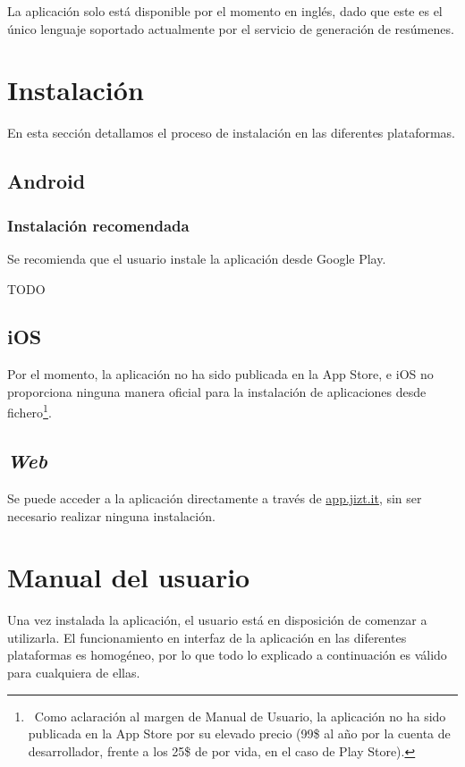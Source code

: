La aplicación solo está disponible por el momento en inglés, dado que este es el único lenguaje soportado actualmente por el servicio de generación de resúmenes.

\section{Instalación}

En esta sección detallamos el proceso de instalación en las diferentes plataformas.

\subsection{Android}

\subsubsection{Instalación recomendada}

Se recomienda que el usuario instale la aplicación desde Google Play.

TODO

\subsection{iOS}

Por el momento, la aplicación no ha sido publicada en la App Store, e iOS no proporciona ninguna manera oficial para la instalación de aplicaciones desde fichero\footnote{\, Como aclaración al margen de Manual de Usuario, la aplicación no ha sido publicada en la App Store por su elevado precio (99\$ al año por la cuenta de desarrollador, frente a los 25\$ de por vida, en el caso de Play Store).}.

\subsection{\emph{Web}}

Se puede acceder a la aplicación directamente a través de \href{https://app.jizt.it}{app.jizt.it}, sin ser necesario realizar ninguna instalación.

\section{Manual del usuario}

Una vez instalada la aplicación, el usuario está en disposición de comenzar a utilizarla. El funcionamiento en interfaz de la aplicación en las diferentes plataformas es homogéneo, por lo que todo lo explicado a continuación es válido para cualquiera de ellas.

